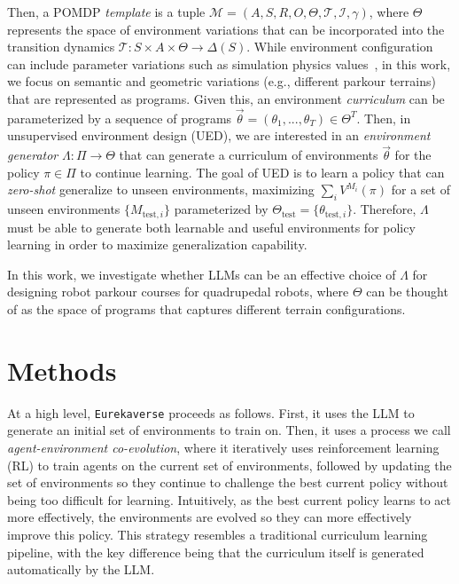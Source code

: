 \documentclass{article}
\newcommand{\ourmethod}{\texttt{Eurekaverse}\xspace}
\begin{document}
Then, a  POMDP \textit{template} is a tuple $ \mathcal{M} = (A, S, R, O, \Theta, \mathcal{T},\mathcal{I}, \gamma)$, where $\Theta$ represents the space of environment variations that can be incorporated into the transition dynamics $\mathcal{T}: S\times A \times \Theta \rightarrow \Delta(S)$. While environment configuration can include parameter variations such as simulation physics values~\citep{ma2024dreureka}, in this work, we focus on semantic and geometric variations (e.g., different parkour terrains) that are represented as programs. Given this, an environment \textit{curriculum} can be parameterized by a sequence of programs $\vec{\theta}=(\theta_1,...,\theta_T) \in \Theta^T$. Then, in unsupervised environment design (UED), we are interested in an \textit{environment generator} $\Lambda:\Pi \rightarrow \Theta$ that can generate a curriculum of environments $\vec{\theta}$ for the policy $\pi \in \Pi$ to continue learning. The goal of UED is to learn a policy that can \textit{zero-shot} generalize to unseen environments, maximizing $\sum_i V^{M_i}(\pi)$ for a set of unseen environments $\{M_{\text{test}, i}\}$ parameterized by $\Theta_{\text{test}} = \{\theta_{\text{test},i}\}$. Therefore, $\Lambda$ must be able to generate both learnable and useful environments for policy learning in order to maximize generalization capability.

In this work, we investigate whether LLMs can be an effective choice of $\Lambda$ for designing robot parkour courses for quadrupedal robots, where $\Theta$ can be thought of as the space of programs that captures different terrain configurations. 


\section{Methods}
\label{sec:method}
At a high level, \ourmethod proceeds as follows. First, it uses the LLM to generate an initial set of environments to train on. Then, it uses a process we call \emph{agent-environment co-evolution}, where it iteratively uses reinforcement learning (RL) to train agents on the current set of environments, followed by updating the set of environments so they continue to challenge the best current policy without being too difficult for learning. Intuitively, as the best current policy learns to act more effectively, the environments are evolved so they can more effectively improve this policy. This strategy resembles a traditional curriculum learning pipeline, with the key difference being that the curriculum itself is generated automatically by the LLM.
\end{document}
